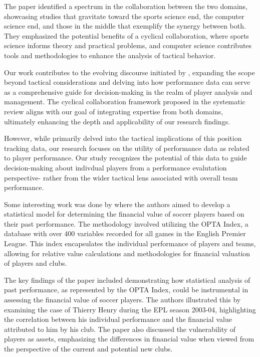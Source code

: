 \documentclass[12pt]{article}
\begin{document}
The paper identified a spectrum in the collaboration between the two domains,
showcasing studies that gravitate toward the sports science end, the computer
science end, and those in the middle that exemplify the synergy between both.
They emphasized the potential benefits of a cyclical collaboration, where sports
science informs theory and practical problems, and computer science contributes
tools and methodologies to enhance the analysis of tactical behavior.

Our work contributes to the evolving discourse initiated by \citet{goes2021unlocking},
expanding the scope beyond tactical considerations and delving into how performance
data can serve as a comprehensive guide for decision-making in the realm of
player analysis and management. The cyclical collaboration framework proposed in
the systematic review aligns with our goal of integrating expertise from both
domains, ultimately enhancing the depth and applicability of our research findings.

However, while \citet{goes2021unlocking} primarily delved into the tactical
implications of this position tracking data, our research focuses on the  
utility of performance data as related to player performance. 
Our study recognizes the potential of this data to guide decision-making about
indivdual players from a performance evalutation perspective- rather from the 
wider tactical lens associated with overall team performance.


Some interesting work was done by \citet{tunaru2010valuations} where
the authors aimed to develop a statistical model for
determining the financial value of soccer players based on their past performance.
The methodology involved utilizing the OPTA Index, a database with over 400
variables recorded for all games in the English Premier League. This index
encapsulates the individual performance of players and teams, allowing for
relative value calculations and methodologies for financial valuation of players
and clubs.

The key findings of the paper included demonstrating how statistical analysis of
past performance, as represented by the OPTA Index, could be instrumental in
assessing the financial value of soccer players. The authors illustrated this by
examining the case of Thierry Henry during the EPL season 2003-04, highlighting
the correlation between his individual performance and the financial value
attributed to him by his club. The paper also discussed the vulnerability of
players as assets, emphasizing the differences in financial value when viewed
from the perspective of the current and potential new clubs.
\end{document}
